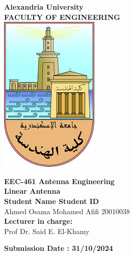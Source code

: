 \documentclass[a4paper, 12pt, english]{article}
\begin{document}
\begin{titlepage}
\begin{center}
\textbf{\LARGE Alexandria University}\\[0.5cm] 
\textbf{\large FACULTY OF ENGINEERING}\\[0.2cm]
\vspace{20pt}
\includegraphics{logo.png}\\[1cm]
\par
\vspace{20pt}
\textbf{\Large EEC-461 Antenna Engineering}\\
\vspace{15pt}
\myrule[1pt][7pt]
\textbf{\LARGE Linear Antenna}\\
\myrule[1pt][7pt]
\vspace{25pt}
\textbf{\large \hspace{50pt}Student Name \hspace{60pt} Student ID}\\
Ahmed Osama Mohamed Afifi \hspace{60pt} 20010038 \\

\vspace{45pt}
\textbf {\large Lecturer in charge:}\\[0.2cm]
\Large {Prof Dr. Said E. El-Khamy}\\[0.1cm]
\end{center}

\par
\vfill
\begin{center}
\textbf{Submission Date : 31/10/2024}\\
\end{center}

\end{titlepage}
\end{document}
